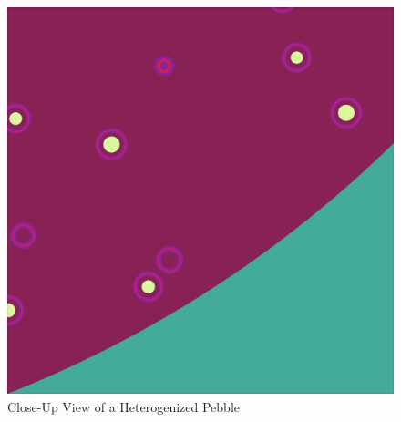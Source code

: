 \begin{figure}[h!]
\centering
\includegraphics[width=0.6\linewidth]{figures/het/het-zoom}
\caption{Close-Up View of a Heterogenized Pebble}
\label{fig:het-zoom}
\end{figure}